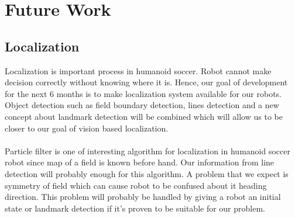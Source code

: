 \section{Future Work}
	\subsection{Localization}
		Localization is important process in humanoid soccer. Robot cannot make decision correctly without knowing where it is. Hence, our goal of development for the next 6 months is to make localization system available for our robots. Object detection such as field boundary detection, lines detection and a new concept about landmark detection will be combined which will allow us to be closer to our goal of vision based localization.
		
		\paragraph{}
		Particle filter is one of interesting algorithm for localization in humanoid soccer robot since map of a field is known before hand. Our information from line detection will probably enough for this algorithm. A problem that we expect is symmetry of field which can cause robot to be confused about it heading direction. This problem will probably be handled by giving a robot an initial state or landmark detection if it's proven to be suitable for our problem.
